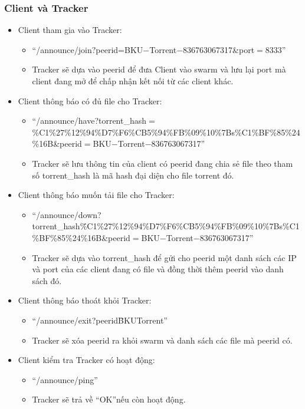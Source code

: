 \documentclass[a4paper]{article}
\begin{document}
    \subsubsection{Client và Tracker}
    \begin{itemize}
        \item Client tham gia vào Tracker:
        \begin{itemize}
            \item \textquotedblleft/announce/join$?$peerid=BKU$-$Torrent$-$836763067317\&port$=$8333\textquotedblright
            \item Tracker sẽ dựa vào peerid để đưa Client vào swarm và lưu lại port mà client đang mở để chấp nhận kết nối từ các client khác.
        \end{itemize}
        \item Client thông báo có đủ file cho Tracker:
        \begin{itemize}
            \item \textquotedblleft/announce/have?torrent\_hash$=$\%C1\%27\%12\%94\%D7\%F6\%CB5\%94\%FB\%09\%10\%7Bs\%C1\%BF\%85\%24\%16B\&peerid$=$BKU$-$Torrent$-$836763067317\textquotedblright
            \item Tracker sẽ lưu thông tin của client có peerid đang chia sẻ file theo tham số torrent\_hash là mã hash đại diện cho file torrent đó.
        \end{itemize}
        \item Client thông báo muốn tải file cho Tracker:
        \begin{itemize}
            \item \textquotedblleft/announce/down?torrent\_hash\=\%C1\%27\%12\%94\%D7\%F6\%CB5\%94\%FB\%09\%10\%7Bs\%C1\%BF\%85\%24\%16B\&peerid$=$BKU$-$Torrent$-$836763067317\textquotedblright
            \item Tracker sẽ dựa vào torrent\_hash để gửi cho peerid một danh sách các IP và port của các client đang có file và đồng thời thêm peerid vào danh sách đó.
        \end{itemize}
        \item Client thông báo thoát khỏi Tracker:
        \begin{itemize}
            \item \textquotedblleft/announce/exit?peerid\=BKU\-Torrent\textquotedblright
            \item Tracker sẽ xóa peerid ra khỏi swarm và danh sách các file mà peerid có.
        \end{itemize}
        \item Client kiểm tra Tracker có hoạt động:
        \begin{itemize}
            \item \textquotedblleft/announce/ping\textquotedblright
            \item Tracker sẽ trả về \textquotedblleft OK\textquotedblright nếu còn hoạt động.
        \end{itemize}
    \end{itemize}
\end{document}
